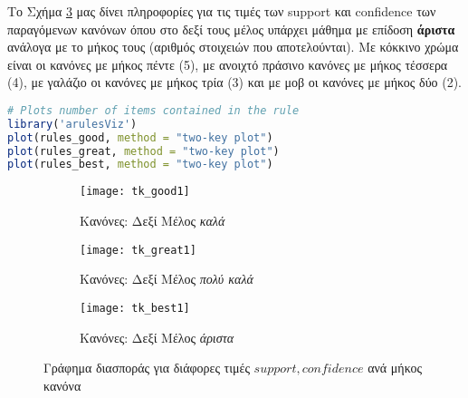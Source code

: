 \documentclass[12pt,a4paper,final]{article}
\begin{document}
Το Σχήμα \ref{fig:tk_best} μας δίνει πληροφορίες για τις τιμές των \foreignlanguage{english}{support} και \foreignlanguage{english}{confidence} των παραγόμενων κανόνων όπου στο δεξί τους μέλος υπάρχει μάθημα με επίδοση \textbf{άριστα} ανάλογα με το μήκος τους (αριθμός στοιχειών που αποτελούνται). Με κόκκινο χρώμα είναι οι κανόνες με μήκος πέντε (5), με ανοιχτό πράσινο κανόνες με μήκος τέσσερα (4), με γαλάζιο οι κανόνες με μήκος τρία (3) και με μοβ οι κανόνες με μήκος δύο (2).

\begin{lstlisting}[language=R]
# Plots number of items contained in the rule
library('arulesViz')
plot(rules_good, method = "two-key plot")
plot(rules_great, method = "two-key plot")
plot(rules_best, method = "two-key plot")
\end{lstlisting}
\begin{figure}[h]
     \centering
     \begin{subfigure}[b]{0.475\textwidth}
         \centering
         \texttt{[image: tk\_good1]}
         \caption{Κανόνες: Δεξί Μέλος \textit{καλά}}
         \label{fig:tk_good}
     \end{subfigure}
     \hfill
     \begin{subfigure}[b]{0.475\textwidth}
         \centering
         \texttt{[image: tk\_great1]}
         \caption{Κανόνες: Δεξί Μέλος \textit{πολύ καλά}}
         \label{fig:tk_great}
     \end{subfigure}
     
     \begin{subfigure}[b]{0.475\textwidth}
         \centering
         \texttt{[image: tk\_best1]}
         \caption{Κανόνες: Δεξί Μέλος \textit{άριστα}}
         \label{fig:tk_best}
     \end{subfigure}
        \label{fig:tk_rules}
       	\caption{Γράφημα διασποράς για διάφορες τιμές $support, confidence$ ανά μήκος κανόνα}
\end{figure}
\clearpage
\end{document}
